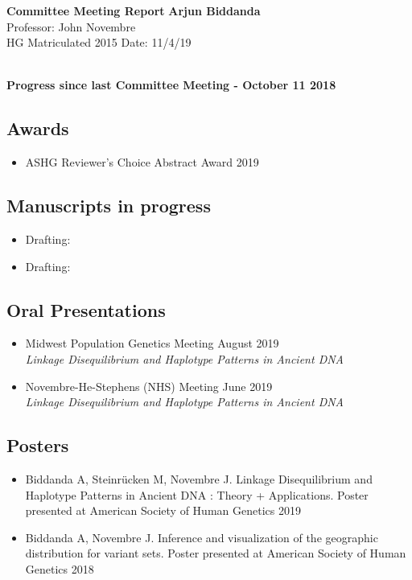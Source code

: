 \documentclass[a4paper, 11pt]{article}
\begin{document}
\noindent
\large\textbf{Committee Meeting Report} \hfill \textbf{Arjun Biddanda} \\
\normalsize  \hfill Professor: John Novembre  \\
HG Matriculated 2015 \hfill Date: 11/4/19 \\
\noindent\makebox[\linewidth]{\rule{\paperwidth}{0.4pt}}

\large\textbf{\\Progress since last Committee Meeting - October 11 2018}
\subsection*{Awards}
\begin{itemize}
    \item ASHG Reviewer's Choice Abstract Award  \hfill 2019 
\end{itemize} 

\subsection*{Manuscripts in progress}
\begin{itemize}
    \item Drafting:  
		\item Drafting: 
\end{itemize}

\subsection*{Oral Presentations}
\begin{itemize}
	\item Midwest Population Genetics Meeting \hfill August 2019 \\ \emph{Linkage Disequilibrium and Haplotype Patterns in Ancient DNA}
	\item Novembre-He-Stephens (NHS) Meeting \hfill June 2019 \\ \emph{Linkage Disequilibrium and Haplotype Patterns in Ancient DNA}   
\end{itemize}

\subsection*{Posters}
\begin{itemize}
	 \item Biddanda A, Steinr\"{u}cken M, Novembre J. Linkage Disequilibrium and Haplotype Patterns in Ancient DNA : Theory + Applications. Poster presented at American Society of Human Genetics 2019
	 \item Biddanda A, Novembre J. Inference and visualization of the geographic distribution for variant sets. Poster presented at American Society of Human Genetics 2018 
\end{itemize}
\end{document}
